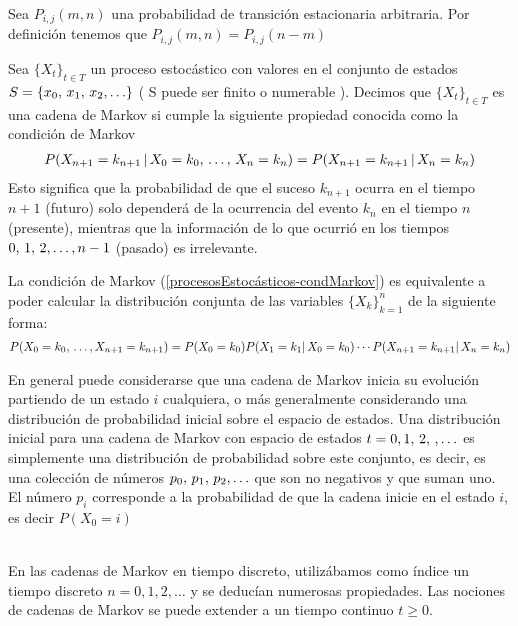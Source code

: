 \begin{Obs}
    Sea $P_{i,j}(m,n)$ una probabilidad de transición estacionaria arbitraria. Por definición tenemos que $P_{i,j}(m,n)=P_{i,j}(n-m)$
\end{Obs}
\begin{Def}
    Sea  $\{X_t\}_{t\in T}$ un proceso estocástico con valores en el conjunto de estados $S=\{x_0,\thinspace x_1,\thinspace x_2 ,\ldots\}$ ( S puede ser finito o numerable ).
    Decimos que $\{X_t\}_{t\in T}$ es una cadena de Markov si cumple la siguiente propiedad conocida como la condición de Markov
    \begin{eqnarray}
    P(X_{n+1}=k_{n+1}\thinspace|\thinspace  X_{0}=k_0,\thinspace\ldots,\thinspace X_{n}=k_n)=P(X_{n+1}=k_{n+1}\thinspace|\thinspace X_{n}=k_n)
    \label{procesosEstocásticos-condMarkov}
    \end{eqnarray}
    Esto significa que la probabilidad de que el suceso $k_{n+1}$ ocurra en el tiempo $n+1$ (futuro) solo dependerá de la ocurrencia del evento $k_n$ en el tiempo $n$ (presente), mientras que la información de lo que ocurrió en los tiempos $0,\thinspace 1,\thinspace 2, \ldots,n-1$ (pasado) es irrelevante.
\end{Def}
\begin{Teo}
    La condición de Markov (\ref{procesosEstocásticos-condMarkov}) es equivalente a poder calcular la distribución conjunta de las variables $\{X_k\}_{k=1}^n$ de la siguiente forma:
    \begin{eqnarray}
    \label{procesosEstocásticos-condMarkovEquiv}
    P(X_0= k_0,\thinspace\ldots,X_{n+1}= k_{n+1}) =P(X_0=k_0)P(X_1=k_1|\thinspace X_0=k_0)\cdots P(X_{n+1}=k_{n+1}|\thinspace X_n=k_n)
    \end{eqnarray}
\end{Teo}
En general puede considerarse que una cadena de Markov inicia su evolución
partiendo de un estado $i$ cualquiera, o más generalmente considerando una
distribución de probabilidad inicial sobre el espacio de estados. Una distribución inicial para una cadena de Markov con espacio de estados $t= 0, 1,\thinspace 2,\thinspace,\ldots  $ es simplemente una distribución de probabilidad sobre este conjunto, es decir,
es una colección de números $p_0,\thinspace p_1,\thinspace p_2 ,\ldots$ que son no negativos y que suman uno. El número $p_i$ corresponde a la probabilidad de que la cadena inicie en el estado $i$, es decir $P(X_0= i)$\\ \\
\begin{Obs}
    En las cadenas de Markov en tiempo discreto, utilizábamos como índice un tiempo
    discreto $n=0, 1, 2,\ldots$ y se deducían numerosas propiedades.
    Las nociones de cadenas de Markov se puede extender a un tiempo continuo $t \geq 0$.
\end{Obs}
